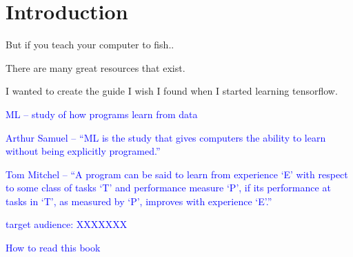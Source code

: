 \chapter{Introduction}

But if you teach your computer to fish..


There are many great resources that exist.

I wanted to create the guide I wish I found when I started learning tensorflow.


%
\textcolor{blue}{ML -- study of how programs learn from data}

\textcolor{blue}{Arthur Samuel -- ``ML is the study that gives computers the ability to learn without being explicitly programed.''}

\textcolor{blue}{Tom Mitchel -- ``A program can be said to learn from experience `E' with respect to some class of tasks `T' and performance measure `P', if its performance at tasks in `T', as measured by `P', improves with experience `E'.''}

%
\textcolor{blue}{target audience: XXXXXXX}


%
\textcolor{blue}{How to read this book}